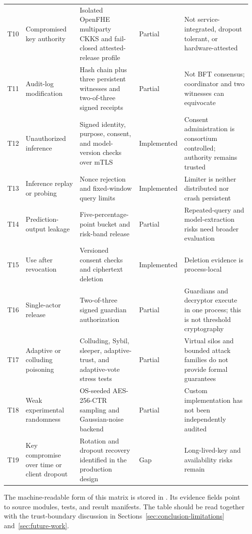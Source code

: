 \begin{longtable}{@{}p{0.8cm}p{3.2cm}p{5.1cm}p{1.4cm}p{4.0cm}@{}}
    T10 & Compromised key authority & Isolated OpenFHE multiparty CKKS and fail-closed attested-release profile & Partial & Not service-integrated, dropout tolerant, or hardware-attested \\
    T11 & Audit-log modification & Hash chain plus three persistent witnesses and two-of-three signed receipts & Partial & Not BFT consensus; coordinator and two witnesses can equivocate \\
    T12 & Unauthorized inference & Signed identity, purpose, consent, and model-version checks over mTLS & Implemented & Consent administration is consortium controlled; authority remains trusted \\
    T13 & Inference replay or probing & Nonce rejection and fixed-window query limits & Implemented & Limiter is neither distributed nor crash persistent \\
    T14 & Prediction-output leakage & Five-percentage-point bucket and risk-band release & Partial & Repeated-query and model-extraction risks need broader evaluation \\
    T15 & Use after revocation & Versioned consent checks and ciphertext deletion & Implemented & Deletion evidence is process-local \\
    T16 & Single-actor release & Two-of-three signed guardian authorization & Partial & Guardians and decryptor execute in one process; this is not threshold cryptography \\
    T17 & Adaptive or colluding poisoning & Colluding, Sybil, sleeper, adaptive-trust, and adaptive-vote stress tests & Partial & Virtual silos and bounded attack families do not provide formal guarantees \\
    T18 & Weak experimental randomness & OS-seeded AES-256-CTR sampling and Gaussian-noise backend & Partial & Custom implementation has not been independently audited \\
    T19 & Key compromise over time or client dropout & Rotation and dropout recovery identified in the production design & Gap & Long-lived-key and availability risks remain \\
\end{longtable}

The machine-readable form of this matrix is stored in . Its evidence fields point to source modules, tests, and result manifests. The table should be read together with the trust-boundary discussion in Sections~\ref{sec:conclusion-limitations} and~\ref{sec:future-work}.


